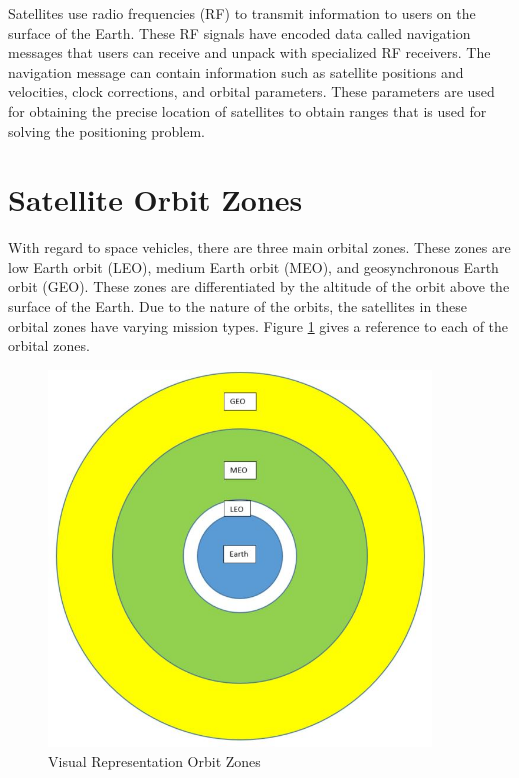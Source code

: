 \documentclass[12pt]{report}
\begin{document}
Satellites use radio frequencies (RF) to transmit information to users on the surface of the Earth. These RF signals have encoded data called navigation messages that users can receive and unpack with specialized RF receivers. The navigation message can contain information such as satellite positions and velocities, clock corrections, and orbital parameters. These parameters are used for obtaining the precise location of satellites to obtain ranges that is used for solving the positioning problem. 

\section{Satellite Orbit Zones}

With regard to space vehicles, there are three main orbital zones. These zones are low Earth orbit (LEO), medium Earth orbit (MEO), and geosynchronous Earth orbit (GEO). These zones are differentiated by the altitude of the orbit above the surface of the Earth. Due to the nature of the orbits, the satellites in these orbital zones have varying mission types. Figure \ref{fig:satorbzone} gives a reference to each of the orbital zones. 

\begin{figure}
    \centering
    \includegraphics[width=4in]{satellite_orbit_zones.JPG}
    \caption{Visual Representation Orbit Zones}
    \label{fig:satorbzone}

\end{figure}
\end{document}
